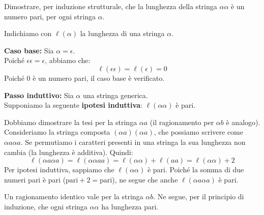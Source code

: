 \begin{esempio}
    
    Dimostrare, per induzione strutturale, che la lunghezza della stringa \( \alpha\alpha \) è un numero pari, per ogni stringa \( \alpha \).



    Indichiamo con \( \ell(\alpha) \) la lunghezza di una stringa \( \alpha \).
    
    \textbf{Caso base:} Sia \( \alpha = \epsilon \). \\
    Poiché \( \epsilon\epsilon = \epsilon \), abbiamo che:
    \[ \ell(\epsilon\epsilon) = \ell(\epsilon) = 0 \]
    Poiché 0 è un numero pari, il caso base è verificato.

    \textbf{Passo induttivo:} Sia \( \alpha \) una stringa generica. \\
    Supponiamo la seguente \textbf{ipotesi induttiva}: \( \ell(\alpha\alpha) \) è pari.

   Dobbiamo dimostrare la tesi per la stringa \( \alpha a \) (il ragionamento per \( \alpha b \) è analogo).
    Consideriamo la stringa composta \( (\alpha a)(\alpha a) \), che possiamo scrivere come \( \alpha a \alpha a \).
    Se permutiamo i caratteri presenti in una stringa la sua lunghezza non cambia (la lunghezza è additiva). Quindi:
    \[
    \ell(\alpha a \alpha a) = \ell(\alpha \alpha a a) = \ell(\alpha \alpha) + \ell(a a) = \ell(\alpha \alpha) + 2
    \]
    Per ipotesi induttiva, sappiamo che \( \ell(\alpha\alpha) \) è pari. Poiché la somma di due numeri pari è pari (\( \text{pari} + 2 = \text{pari} \)), ne segue che anche \( \ell(\alpha a \alpha a) \) è pari.
    
    Un ragionamento identico vale per la stringa \( \alpha b \).
    Ne segue, per il principio di induzione, che ogni stringa \( \alpha\alpha \) ha lunghezza pari.

\end{esempio}






















